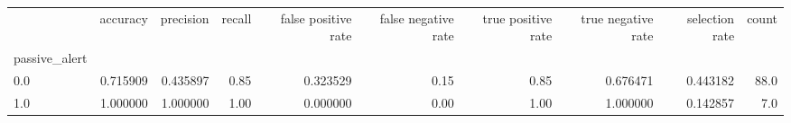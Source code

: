 \begin{tabular}{lrrrrrrrrr}
\toprule
{} &  accuracy &  precision &  recall &  false positive rate &  false negative rate &  true positive rate &  true negative rate &  selection rate &  count \\
passive\_alert &           &            &         &                      &                      &                     &                     &                 &        \\
\midrule
0.0           &  0.715909 &   0.435897 &    0.85 &             0.323529 &                 0.15 &                0.85 &            0.676471 &        0.443182 &   88.0 \\
1.0           &  1.000000 &   1.000000 &    1.00 &             0.000000 &                 0.00 &                1.00 &            1.000000 &        0.142857 &    7.0 \\
\bottomrule
\end{tabular}
